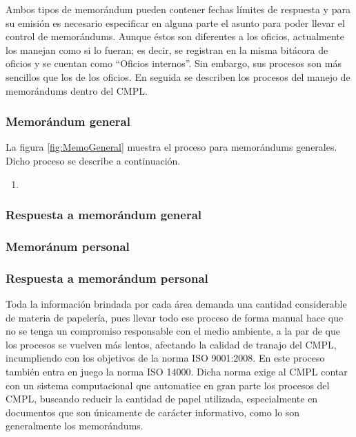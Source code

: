 	Ambos tipos de memorándum pueden contener fechas límites de respuesta y para su emisión es necesario especificar en alguna parte el asunto para poder llevar el control de memorándums. Aunque éstos son diferentes a los oficios, actualmente los manejan como si lo fueran; es decir, se registran en la misma bitácora de oficios y se cuentan como ``Oficios internos''. Sin embargo, sus procesos son más sencillos que los de los oficios. En seguida se describen los procesos del manejo de memorándums dentro del CMPL. 

	\subsubsection{Memorándum general}
	La figura \ref{fig:MemoGeneral} muestra el proceso para memorándums generales. Dicho proceso se describe a continuación.
	
	\begin{enumerate}
		\item 
	\end{enumerate}
	
	
	\subsubsection{Respuesta a memorándum general}
	
	\subsubsection{Memoránum personal}
	
	\subsubsection{Respuesta a memorándum personal}
	
	
	Toda la información brindada por cada área demanda una cantidad considerable de materia de papelería, pues llevar todo ese proceso de forma manual hace que no se tenga un compromiso responsable con el medio ambiente, a la par de que los procesos se vuelven más lentos, afectando la calidad de tranajo del CMPL, incumpliendo con los objetivos de la norma ISO 9001:2008.  En este proceso también entra en juego la norma ISO 14000. Dicha norma exige al CMPL contar con un sistema computacional que automatice en gran parte los procesos del CMPL, buscando reducir la cantidad de papel utilizada, especialmente en documentos que son únicamente de carácter informativo, como lo son generalmente los memorándums.\\
	

